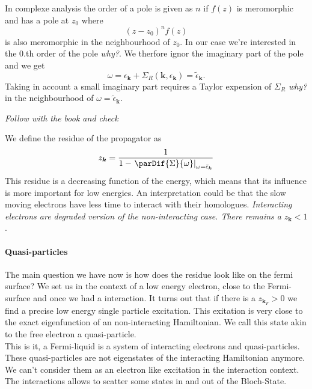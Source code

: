 \documentclass[../main.tex]{subfile}
\begin{document}
In complexe analysis the order of a pole is given as $n$ if $f(z)$ is meromorphic and has a pole at $z_0$ where
\[
    (z-z_0)^n f(z)
\]
is also meromorphic in the neighbourhood of $z_0$. In our case we're interested in the 0.th order of the pole \textit{why?}. 
We therfore ignor the imaginary part of the pole and we get
\[
    \omega = \epsilon_{\bm{k}} + \Sigma_R(\bm{k}, \epsilon_{\bm{k}}) = \tilde{\epsilon}_{\bm{k}}.  
\]
Taking in account a small imaginary part requires a Taylor expension of $\Sigma_{R}$ \textit{why?} in the neighbourhood of $\omega = \tilde{\epsilon}_{\bm{k}}$.
\begin{center}
    \textit{Follow with the book and check}
\end{center}
We define the residue of the propagator as 
\begin{equation}
    z_{\bm{k}} = \frac{1}{1- \left.\parDif{\Sigma}{\omega}\right|_{\omega = \tilde{\epsilon}_{\bm{k}}}} \label{eq:residue}
\end{equation}
This residue is a decreasing function of the energy, which means that its influence is more important for low energies. 
An interpretation could be that the slow moving electrons have less time to interact with their homologues. 
\textit{Interacting electrons are degraded version of the non-interacting case. There remains a} $z_{\bm{k}}<1$.\\ 

\paragraph{Quasi-particles}
The main question we have now is how does the residue look like on the fermi surface? We set us in the context of a low energy electron, close to the Fermi-surface and 
once we had a interaction. It turns out that if there is a $z_{\bm{k}_F}>0$ we find a precise low energy single particle excitation. This exitation is very close
to the exact eigenfunction of an non-interacting Hamiltonian. We call this state akin to the free electron a quasi-particle.\\

This is it, a Fermi-liquid is a system of interacting electrons and quasi-particles. These quasi-particles are not eigenstates of the interacting Hamiltonian anymore.
We can't consider them as an electron like excitation in the interaction context.
The interactions allows to scatter some states in and out of the Bloch-State. \\
\end{document}
